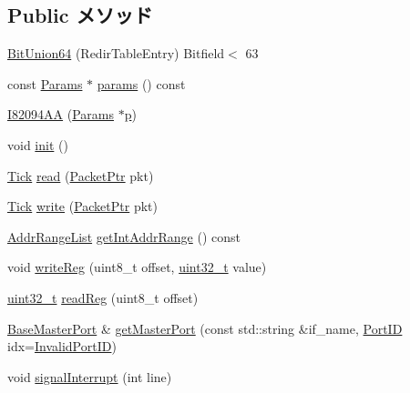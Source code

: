 \subsection*{Public メソッド}
\begin{DoxyCompactItemize}
\item 
\hyperlink{classX86ISA_1_1I82094AA_a97c44df53cb92aeac5243310502a31f4}{BitUnion64} (RedirTableEntry) Bitfield$<$ 63
\item 
const \hyperlink{classX86ISA_1_1I82094AA_ab98883343dbcbe45660e9b16b61507ad}{Params} $\ast$ \hyperlink{classX86ISA_1_1I82094AA_acd3c3feb78ae7a8f88fe0f110a718dff}{params} () const 
\item 
\hyperlink{classX86ISA_1_1I82094AA_a65401d9d5f73fed0b27a6c9aa13f0ded}{I82094AA} (\hyperlink{classX86ISA_1_1I82094AA_ab98883343dbcbe45660e9b16b61507ad}{Params} $\ast$\hyperlink{namespaceX86ISA_af675c1d542a25b96e11164b80809a856}{p})
\item 
void \hyperlink{classX86ISA_1_1I82094AA_a02fd73d861ef2e4aabb38c0c9ff82947}{init} ()
\item 
\hyperlink{base_2types_8hh_a5c8ed81b7d238c9083e1037ba6d61643}{Tick} \hyperlink{classX86ISA_1_1I82094AA_a613ec7d5e1ec64f8d21fec78ae8e568e}{read} (\hyperlink{classPacket}{PacketPtr} pkt)
\item 
\hyperlink{base_2types_8hh_a5c8ed81b7d238c9083e1037ba6d61643}{Tick} \hyperlink{classX86ISA_1_1I82094AA_a4cefab464e72b5dd42c003a0a4341802}{write} (\hyperlink{classPacket}{PacketPtr} pkt)
\item 
\hyperlink{classstd_1_1list}{AddrRangeList} \hyperlink{classX86ISA_1_1I82094AA_ad86b339471781a0d7634d3c41c6a1c87}{getIntAddrRange} () const 
\item 
void \hyperlink{classX86ISA_1_1I82094AA_ae27db6ba83a73230a1bd07e9a0bc7bd0}{writeReg} (uint8\_\-t offset, \hyperlink{Type_8hh_a435d1572bf3f880d55459d9805097f62}{uint32\_\-t} value)
\item 
\hyperlink{Type_8hh_a435d1572bf3f880d55459d9805097f62}{uint32\_\-t} \hyperlink{classX86ISA_1_1I82094AA_a2e9f685c7a9db218d1bb3db976b98e9c}{readReg} (uint8\_\-t offset)
\item 
\hyperlink{classBaseMasterPort}{BaseMasterPort} \& \hyperlink{classX86ISA_1_1I82094AA_adc4e675e51defbdd1e354dac729d0703}{getMasterPort} (const std::string \&if\_\-name, \hyperlink{base_2types_8hh_acef4d7d41cb21fdc252e20c04cd7bb8e}{PortID} idx=\hyperlink{base_2types_8hh_a65bf40f138cf863f0c5e2d8ca1144126}{InvalidPortID})
\item 
void \hyperlink{classX86ISA_1_1I82094AA_a9d80b13f2832340962ab374bc9a14c4f}{signalInterrupt} (int line)

\end{DoxyCompactItemize}
